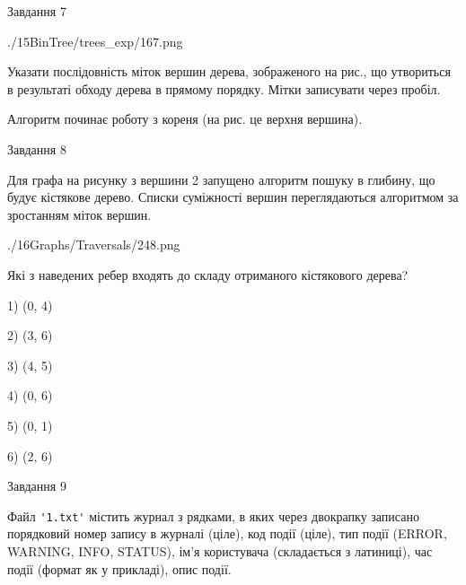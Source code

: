 \documentclass[12pt, ukrainian]{article}
\def\code#1{\Verb!#1!}
\begin{document}
{\vspace{10mm}\par

\newpage
\begin{minipage}[t]{9.7cm}
               
{\begin{center}Завдання {7}\end{center}}
\vspace{-6mm}

\begin{center}
	{./15BinTree/trees_exp/167.png}
\end{center}
Указати послідовність міток вершин дерева, зображеного на рис., що утвориться в результаті обходу дерева в прямому порядку. Мітки записувати через пробіл.\par Алгоритм починає роботу з кореня (на рис. це верхня вершина).\par

\end{minipage}
\vline \hspace{8mm}
\begin{minipage}[t]{8.0cm}
               
{\begin{center}Завдання {8}\end{center}}
\vspace{-6mm}
Для графа на рисунку з вершини 2 запущено алгоритм пошуку в глибину, що будує кістякове дерево. Списки суміжності вершин переглядаються алгоритмом за зростанням міток вершин.\par
\begin{center}
	{./16Graphs/Traversals/248.png}
\end{center}
\par Які з наведених ребер входять до складу отриманого кістякового дерева?\par
1) (0, 4)\par
2) (3, 6)\par
3) (4, 5)\par
4) (0, 6)\par
5) (0, 1)\par
6) (2, 6)\par
{\vskip 15pt} \par

\end{minipage}

               
{\begin{center}Завдання {9}\end{center}}
\vspace{-6mm}
Файл \code{'1.txt'} містить журнал з рядками, в яких через двокрапку записано поряд\-ко\-вий номер запису в журналі (ціле), код події (ціле), тип події (ERROR,\\ WARNING, INFO, STATUS), ім'я користувача (складається з латиниці), час події (фор\-мат як у прикладі), опис події.

}
\end{document}
